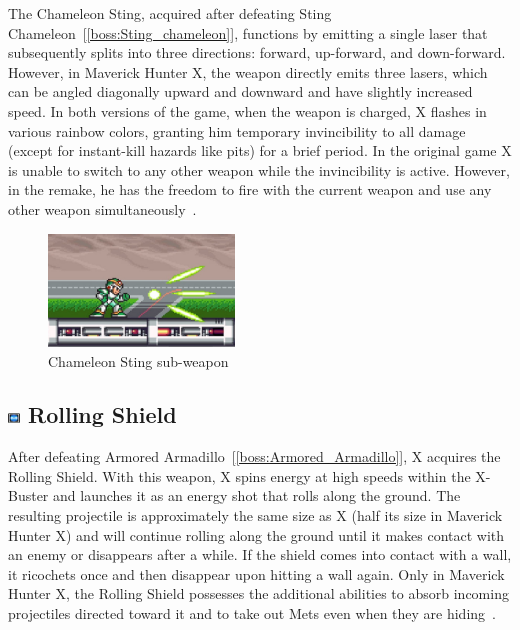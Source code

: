 The Chameleon Sting, acquired after defeating Sting Chameleon~[\ref{boss:Sting_chameleon}], functions by emitting a single laser that subsequently splits into three directions: forward, up-forward, and down-forward. However, in Maverick Hunter X, the weapon directly emits three lasers, which can be angled diagonally upward and downward and have slightly increased speed. In both versions of the game, when the weapon is charged, X flashes in various rainbow colors, granting him temporary invincibility to all damage (except for instant-kill hazards like pits) for a brief period. In the original game X is unable to switch to any other weapon while the invincibility is active. However, in the remake, he has the freedom to fire with the current weapon and use any other weapon simultaneously~\cite{wiki:Chameleon_sting}. 
\begin{figure}[htp]
	\centering
		\includegraphics[height=3cm]{figures/X1/weapons/Chameleon_sting.jpg}
	\caption{Chameleon Sting sub-weapon}
\end{figure}

\subsection{\includegraphics[width=12px, height=10px]{figures/X1/weapons/Rolling_S.jpg} Rolling Shield}\label{Rolling_shield}
After defeating Armored Armadillo~[\ref{boss:Armored_Armadillo}], X acquires the Rolling Shield. With this weapon, X spins energy at high speeds within the X-Buster and launches it as an energy shot that rolls along the ground. The resulting projectile is approximately the same size as X (half its size in Maverick Hunter X) and will continue rolling along the ground until it makes contact with an enemy or disappears after a while. If the shield comes into contact with a wall, it ricochets once and then disappear upon hitting a wall again. Only in Maverick Hunter X, the Rolling Shield possesses the additional abilities to absorb incoming projectiles directed toward it and to take out Mets even when they are hiding~\cite{wiki:Rolling_shield}. 

